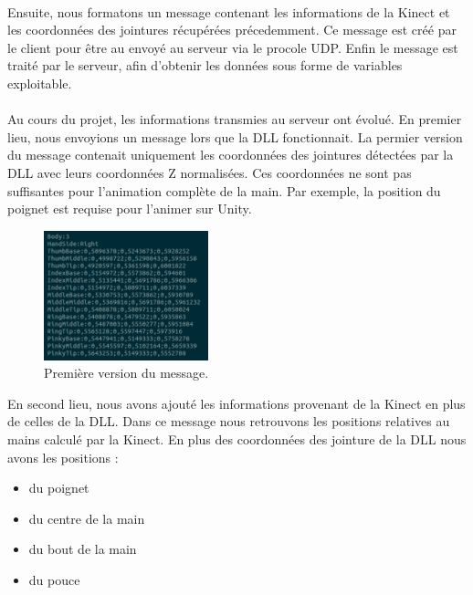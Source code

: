 \paragraph{}
Ensuite, nous formatons un message contenant les informations de la 
Kinect et les coordonnées des jointures récupérées précedemment. Ce 
message est créé par le client pour être au envoyé au serveur via le 
procole UDP. Enfin le message est traité par le serveur, afin d'obtenir 
les données sous forme de variables exploitable.

\paragraph{}
Au cours du projet, les informations transmies au serveur ont évolué. 
En premier lieu, nous envoyions un message lors que la DLL fonctionnait. 
La permier version du message contenait uniquement les coordonnées des 
jointures détectées par la DLL avec leurs coordonnées Z normalisées. 
Ces coordonnées ne sont pas suffisantes pour l'animation complète de la 
main. Par exemple, la position du poignet est requise pour l'animer 
sur Unity.

\begin{figure}[H]
  \begin{center}
    \includegraphics[width=180px]{images/socket_v1.png}
    \caption{Première version du message.}
  \end{center}
\end{figure}

En second lieu, nous avons ajouté les informations provenant de la 
Kinect en plus de celles de la DLL. Dans ce message nous retrouvons 
les positions relatives au mains calculé par la Kinect. En plus des 
coordonnées des jointure de la DLL nous avons les positions :
\begin{itemize}
  \item du poignet
  \item du centre de la main
  \item du bout de la main
  \item du pouce
\end{itemize}

